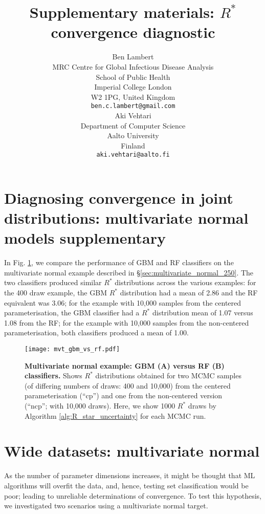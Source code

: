 \documentclass{article}
\title{Supplementary materials: $R^*$ convergence diagnostic}
\author{%
	Ben Lambert\\
	MRC Centre for Global Infectious Disease Analysis\\
	School of Public Health\\
	Imperial College London\\
	W2 1PG, United Kingdom\\
	\texttt{ben.c.lambert@gmail.com} \\
	\And
	Aki Vehtari \\
	Department of Computer Science\\
	Aalto University\\
	Finland\\
	\texttt{aki.vehtari@aalto.fi}
}
\begin{document}
	\maketitle

\color{red}
\section{Diagnosing convergence in joint distributions: multivariate normal models supplementary}\label{sec:multivariate_normal_supp}

In Fig. \ref{fig:mvt_gbm_vs_rf}, we compare the performance of GBM and RF classifiers on the multivariate normal example described in \S\ref{sec:multivariate_normal_250}. The two classifiers produced similar $R^*$ distributions across the various examples: for the 400 draw example, the GBM $R^*$ distribution had a mean of 2.86 and the RF equivalent was 3.06; for the example with 10,000 samples from the centered parameterisation, the GBM classifier had a $R^*$ distribution mean of 1.07 versus 1.08 from the RF; for the example with 10,000 samples from the non-centered parameterisation, both classifiers produced a mean of 1.00.

\begin{figure}[!htb]
	\centerline{\texttt{[image: mvt\_gbm\_vs\_rf.pdf]}}
	\caption{\textbf{Multivariate normal example: GBM (A) versus RF (B) classifiers.} Shows $R^*$ distributions obtained for two MCMC samples (of differing numbers of draws: 400 and 10,000) from the centered parameterisation (``cp'') and one from the non-centered version (``ncp''; with 10,000 draws). Here, we show 1000 $R^*$ draws by Algorithm \ref{alg:R_star_uncertainty} for each MCMC run.}
	\label{fig:mvt_gbm_vs_rf}
\end{figure}

\color{black}


\section{Wide datasets: multivariate normal}\label{sec:wide}
As the number of parameter dimensions increases, it might be thought that ML algorithms will overfit the data, and, hence, testing set classification would be poor; leading to unreliable determinations of convergence. To test this hypothesis, we investigated two scenarios using a multivariate normal target.
\end{document}
